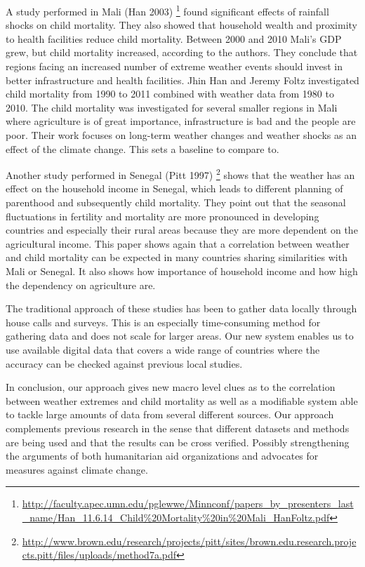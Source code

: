 \documentclass[
10pt, %
a4paper, %
oneside, %
headinclude,footinclude, %
useAMS,
usenatbib
]{mn2e}  %
\begin{document}
A study performed in Mali (Han 2003)
\footnote{\url{http://faculty.apec.umn.edu/pglewwe/Minnconf/papers_by_presenters_last_name/Han_11.6.14_Child\%20Mortality\%20in\%20Mali_HanFoltz.pdf}} found significant effects of rainfall shocks on child mortality. They also showed that household wealth and proximity to health facilities reduce child mortality. Between 2000 and 2010 Mali's GDP grew, but child mortality increased, according to the authors. They conclude that regions facing an increased number of extreme weather events should invest in better infrastructure and health facilities. Jhin Han and Jeremy Foltz investigated child mortality from 1990 to 2011 combined with weather data from 1980 to 2010. The child mortality was investigated for several smaller regions in Mali where agriculture is of great importance, infrastructure is bad and the people are poor. Their work focuses on long-term weather changes and weather shocks as an effect of the climate change. This sets a baseline to compare to.


Another study performed in Senegal (Pitt 1997)
\footnote{\url{http://www.brown.edu/research/projects/pitt/sites/brown.edu.research.projects.pitt/files/uploads/method7a.pdf}} shows that the weather has an effect on the household income in Senegal, which leads to different planning of parenthood and subsequently child mortality. They point out that the seasonal fluctuations in fertility and mortality are more pronounced in developing countries and especially their rural areas because they are more dependent on the agricultural income. This paper shows again that a correlation between weather and child mortality can be expected in many countries sharing similarities with Mali or Senegal. It also shows how importance of household income and how high the dependency on agriculture are.

The traditional approach of these studies has been to gather data locally through house calls and surveys. This is an especially time-consuming method for gathering data and does not scale for larger areas. Our new system enables us to use available digital data that covers a wide range of countries where the accuracy can be checked against previous local studies.

In conclusion, our approach gives new macro level clues as to the correlation between weather extremes and child mortality as well as a modifiable system able to tackle large amounts of data from several different sources. Our approach complements previous research in the sense that different datasets and methods are being used and that the results can be cross verified. Possibly strengthening the arguments of both humanitarian aid organizations and advocates for measures against climate change.
\end{document}

